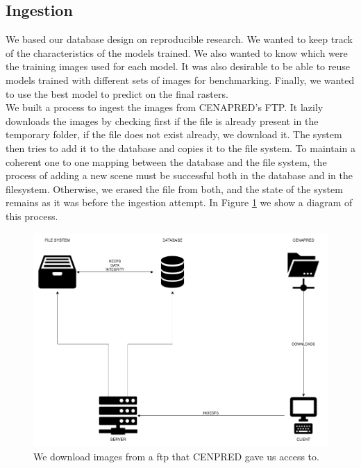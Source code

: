 \subsection{Ingestion}

We based our database design on reproducible research. We wanted to keep track of the characteristics of the models trained. We also wanted to know which were the training images used for each model. It was also desirable to be able to reuse models trained with different sets of images for benchmarking. Finally, we wanted to use the best model to predict on the final rasters.\\

We built a process to ingest the images from CENAPRED's FTP. It lazily downloads the images by checking first if the file is already present in the temporary folder, if the file does not exist already, we download it. The system then tries to add it to the database and copies it to the file system. To maintain a coherent one to one mapping between the database and the file system, the process of adding a new scene must be successful both in the database and in the filesystem. Otherwise, we erased the file from both, and the state of the system remains as it was before the ingestion attempt. In Figure \ref{fig:ingest} we show a diagram of this process.\\

\begin{figure}[!h]
  \centering
  \includegraphics[width=1\textwidth]{images/ingest-diagram.png}
  \caption{We download images from a ftp that CENPRED gave us access to.}
  \label{fig:ingest}
\end{figure}

